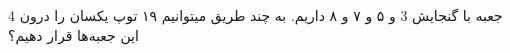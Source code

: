 4 جعبه با گنجایش 3 و ۵ و ۷ و ۸ داریم. به چند طریق میتوانیم ۱۹ توپ یکسان را درون این جعبه‌ها قرار دهیم؟